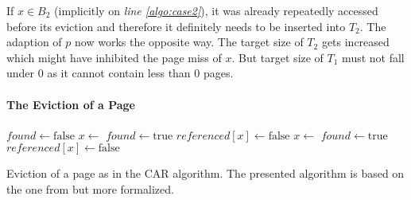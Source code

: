     If $x \in B_2$ (implicitly on \emph{line \ref{algo:case2}}), it was already repeatedly accessed before its eviction and therefore it definitely needs to be inserted into $T_2$. The adaption of $p$ now works the opposite way. The target size of $T_2$ gets increased which might have inhibited the page miss of $x$. But target size of $T_1$ must not fall under $0$ as it cannot contain less than $0$ pages.

\paragraph{The Eviction of a Page}

\begin{@empty}
    \begin{algorithm}[ht!]
        \begin{algorithmic}[1]
                \State $found \gets \text{false}$
                        \State $x \gets $	\label{algo:gett1}	\label{algo:evictt1begin}
                            \State $found \gets \text{true}$
                            \State {}	\label{algo:removet1}
                            \State {}
                        \Else
                            \State $referenced\left[x\right] \gets \text{false}$ \label{algo:unset3}
                            \State {}
                        \EndIf	\label{algo:evictt1end}
                    \Else
                        \State $x \gets $	\label{algo:evictt2begin}
                            \State $found \gets \text{true}$
                            \State {}
                            \State {}
                        \Else
                            \State $referenced\left[x\right] \gets \text{false}$
                            \State {}
                        \EndIf	\label{algo:evictt2end}
                    \EndIf
                \EndWhile
            \EndProcedure
        \end{algorithmic}
        \vspace{.25em}
        \caption{Eviction of a page as in the CAR algorithm. The presented algorithm is based on the one from \cite{Bansal:2004} but more formalized.}
        \label{alg:evict}
    \end{algorithm}
\end{@empty}

